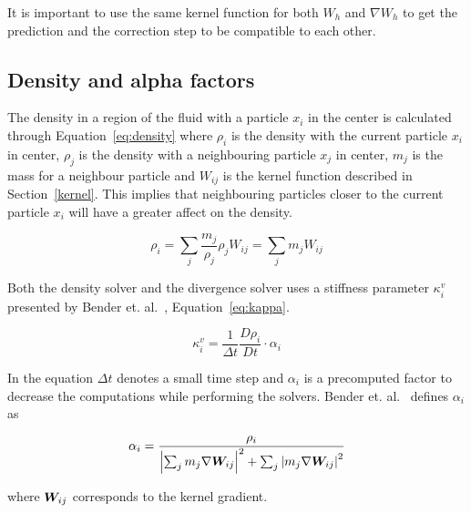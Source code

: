     It is important to use the same kernel function for both $W_h$ and $\nabla W_h$ to get the prediction and the correction step to be compatible to each other.


\subsection{Density and alpha factors} \label{section:alpha}
    The density in a region of the fluid with a particle $x_i$ in the center is calculated through Equation~\ref{eq:density} where $\rho_i$ is the density with the current particle $x_i$ in center, $\rho_j$ is the density with a neighbouring particle $x_j$ in center, $m_j$ is the mass for a neighbour particle and $W_{ij}$ is the kernel function described in Section~\ref{kernel}.
    This implies that neighbouring particles closer to the current particle $x_i$ will have a greater affect on the density.

    \begin{equation} \label{eq:density}
        \rho_i = \sum_j \frac{m_j}{\rho_j} \rho_j W_{ij} = \sum_j m_j W_{ij}
    \end{equation} 

    Both the density solver and the divergence solver uses a stiffness parameter $\kappa_i^v$ presented by Bender et. al.~\cite{bender}, Equation~\ref{eq:kappa}.

    \begin{equation} \label{eq:kappa}
        \kappa_i^v = \frac{1}{\Delta t} \frac{D\rho_i}{Dt} \cdot \alpha_i
    \end{equation} 

    In the equation $\Delta t$ denotes a small time step and $\alpha_i$ is a precomputed factor to decrease the computations while performing the solvers.
    Bender et. al.~\cite{bender} defines $\alpha_i$ as

    \begin{equation} \label{eq:alpha}
        \alpha_i = \frac{\rho_i}{\left | \sum_j m_j \nabla \bm{W}_{ij}  \right |^2 + \sum_j \left | m_j \nabla \bm{W}_{ij} \right |^2}
    \end{equation}

    where $\bm{W}_{ij}$ corresponds to the kernel gradient.

